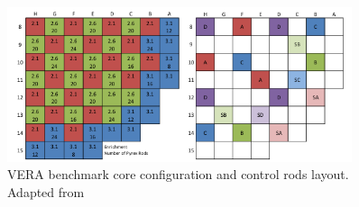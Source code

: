 \begin{figure}
    \centering
    \includegraphics[width=0.9\textwidth]{figs/core.png}
    \caption[VERA benchmark core configuration and control rods layout.]{VERA benchmark core configuration and control rods layout. Adapted from \cite{godfrey}}
    \label{f1}
\end{figure}


\clearpage

\clearpage
